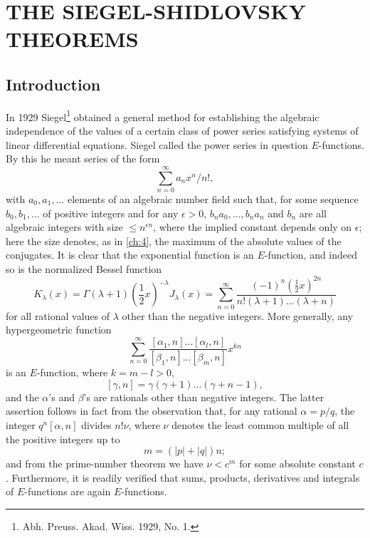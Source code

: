 
\chapter{THE SIEGEL-SHIDLOVSKY THEOREMS}\label{ch:11}

\section{Introduction}\label{sec:ch11_1}

In 1929 Siegel\footnote{Abh. Preuss. Akad. Wiss. 1929, No. 1.} obtained a general method for establishing the algebraic independence of the values of a certain class of power series satisfying systems of linear differential equations. Siegel called the power series in question $E$-functions. By this he meant series of the form
\[\sum_{n=0}^{\infty} a_n x^n / n!,\]
with $a_0, a_1, \ldots$ elements of an algebraic number field such that, for some sequence $b_0, b_1, \ldots$ of positive integers and for any $\epsilon > 0$, $b_n a_0, \ldots, b_n a_n$ and $b_n$ are all algebraic integers with size $\leqslant n^{\epsilon n}$, where the implied constant depends only on $\epsilon$; here the size denotes, as in \autoref{ch:4}, the maximum of the absolute values of the conjugates. It is clear that the exponential function is an $E$-function, and indeed so is the normalized Bessel function
\[K_{\lambda}(x) = \Gamma(\lambda+1) (\frac{1}{2}x)^{-\lambda} J_{\lambda}(x) = \sum_{n=0}^{\infty} \frac{(-1)^n (\frac{1}{2}x)^{2n}}{n! (\lambda+1) \dots (\lambda+n)}\]
for all rational values of $\lambda$ other than the negative integers. More generally, any hypergeometric function
\[\sum_{n=0}^{\infty} \frac{[\alpha_1, n] \dots [\alpha_l, n]}{[\beta_1, n] \dots [\beta_m, n]} x^{kn}\]
is an $E$-function, where $k = m - l > 0$,
\[[\gamma, n] = \gamma(\gamma+1) \dots (\gamma+n-1),\]
and the $\alpha$'s and $\beta$'s are rationals other than negative integers. The latter assertion follows in fact from the observation that, for any rational $\alpha = p/q$, the integer $q^n[\alpha, n]$ divides $n! \nu$, where $\nu$ denotes the least common multiple of all the positive integers up to
\[m = (|p| + |q|) n;\]
and from the prime-number theorem we have $\nu < c^m$ for some absolute constant $c$. Furthermore, it is readily verified that sums, products, derivatives and integrals of $E$-functions are again $E$-functions.

